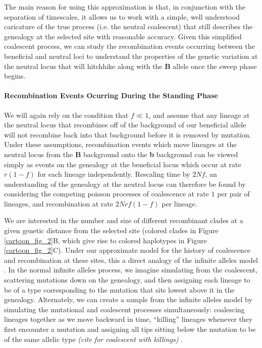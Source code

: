 \documentclass[a4paper,10pt]{article}
\newcommand{\jb}[1]{{\it\color{blue} (#1)} }
\begin{document}
The main reason for using this approximation is that, in conjunction with the separation of timescales, it allows us to work with a simple, well understood caricature of the true process (i.e. the neutral coalescent) that still describes the genealogy at the selected site with reasonable accuracy. Given this simplified coalescent process, we can study the recombination events occurring between the beneficial and neutral loci to understand the properties of the genetic variation at the neutral locus that will hitchhike along with the \textbf{B} allele once the sweep phase begins.

\paragraph{Recombination Events Ocurring During the Standing Phase}

We will again rely on the condition that $f \ll 1$, and assume that any lineage at the neutral locus that recombines off of the background of our beneficial allele will not recombine back into that background before it is removed by mutation. Under these assumptions, recombination events which move lineages at the neutral locus from the \textbf{B} background onto the \textbf{b} background can be viewed simply as events on the genealogy at the beneficial locus which occur at rate $r\left(1-f\right)$ for each lineage independently. Rescaling time by $2Nf$, an understanding of the genealogy at the neutral locus can therefore be found by considering the competing poisson processes of coalescence at rate $1$ per pair of lineages, and recombination at rate $2Nrf(1-f)$ per lineage.

We are interested in the number and size of different recombinant clades at a given genetic distance from the selected site (colored clades in Figure \ref{cartoon_fig_2}B, which give rise to colored haplotypes in Figure \ref{cartoon_fig_2}C). Under our approximate model for the history of coalescence and recombination at these sites, this a direct analogy of the infinite alleles model \citep{Kimura:1964wb,Watterson:1984wb}. In the normal infinite alleles process, we imagine simulating from the coalescent, scattering mutations down on the genealogy, and then assigning each lineage to be of a type corresponding to the mutation that sits lowest above it in the genealogy. Alternately, we can create a sample from the infinite alleles model by simulating the mutational and coalescent processes simultaneously: coalescing lineages together as we move backward in time, ``killing'' lineages whenever they first encounter a mutation and assigning all tips sitting below the mutation to be of the same allelic type \jb{cite for coalescent with killings}.
\end{document}
